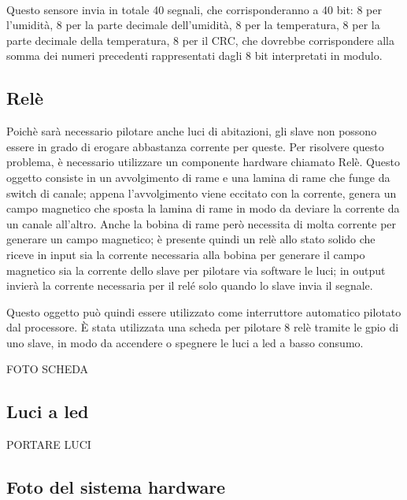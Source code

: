\documentclass[a4paper,titlepage]{book}
\begin{document}
~

Questo sensore invia in totale 40 segnali, che corrisponderanno a 40 bit: 8 per l'umidità, 8 per la parte decimale dell'umidità, 8 per la temperatura, 8 per la parte decimale della temperatura, 8 per il CRC, che dovrebbe corrispondere alla somma dei numeri precedenti rappresentati dagli 8 bit interpretati in modulo.


\subsection{Relè}

Poichè sarà necessario pilotare anche luci di abitazioni, gli slave non possono essere in grado di erogare abbastanza corrente per queste. Per risolvere questo problema, è necessario utilizzare un componente hardware chiamato Relè. Questo oggetto consiste in un avvolgimento di rame e una lamina di rame che funge da switch di canale; appena l'avvolgimento viene eccitato con la corrente, genera un campo magnetico che sposta la lamina di rame in modo da deviare la corrente da un canale all'altro. Anche la bobina di rame però necessita di molta corrente per generare un campo magnetico; è presente quindi un relè allo stato solido che riceve in input sia la corrente necessaria alla bobina per generare il campo magnetico sia la corrente dello slave per pilotare via software le luci; in output invierà la corrente necessaria per il relé solo quando lo slave invia il segnale.

Questo oggetto può quindi essere utilizzato come interruttore automatico pilotato dal processore. È stata utilizzata una scheda per pilotare 8 relè tramite le gpio di uno slave, in modo da accendere o spegnere le luci a led a basso consumo.


FOTO SCHEDA

\subsection{Luci a led}

PORTARE LUCI


\subsection{Foto del sistema hardware}
\end{document}
